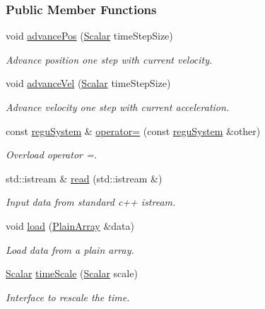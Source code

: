 \subsubsection*{Public Member Functions}
\begin{DoxyCompactItemize}
\item 
void \mbox{\hyperlink{classregu_system_ab1964e22d3d7f6ddaa51c5e7a02534a5}{advance\+Pos}} (\mbox{\hyperlink{classregu_system_aca8ee2c387943164ee3ea68370fc3ac0}{Scalar}} time\+Step\+Size)
\begin{DoxyCompactList}\small\item\em Advance position one step with current velocity. \end{DoxyCompactList}\item 
void \mbox{\hyperlink{classregu_system_ae00564e4aceeec7ce3a8aa6a158aa53e}{advance\+Vel}} (\mbox{\hyperlink{classregu_system_aca8ee2c387943164ee3ea68370fc3ac0}{Scalar}} time\+Step\+Size)
\begin{DoxyCompactList}\small\item\em Advance velocity one step with current acceleration. \end{DoxyCompactList}\item 
const \mbox{\hyperlink{classregu_system}{regu\+System}} \& \mbox{\hyperlink{classregu_system_a894081d40cb90418f791ab52e3c64d5f}{operator=}} (const \mbox{\hyperlink{classregu_system}{regu\+System}} \&other)
\begin{DoxyCompactList}\small\item\em Overload operator =. \end{DoxyCompactList}\item 
std\+::istream \& \mbox{\hyperlink{classregu_system_ae26daf3f6058c1be67fb00366706e2e4}{read}} (std\+::istream \&)
\begin{DoxyCompactList}\small\item\em Input data from standard c++ istream. \end{DoxyCompactList}\item 
void \mbox{\hyperlink{classregu_system_a4da424f127c024fcbef32eff3147b2ff}{load}} (\mbox{\hyperlink{classregu_system_ae2ca73edf865e016a858b694c1d2b49a}{Plain\+Array}} \&data)
\begin{DoxyCompactList}\small\item\em Load data from a plain array. \end{DoxyCompactList}\item 
\mbox{\hyperlink{classregu_system_aca8ee2c387943164ee3ea68370fc3ac0}{Scalar}} \mbox{\hyperlink{classregu_system_ad9aa4594055c550b56cda4242d498d45}{time\+Scale}} (\mbox{\hyperlink{classregu_system_aca8ee2c387943164ee3ea68370fc3ac0}{Scalar}} scale)
\begin{DoxyCompactList}\small\item\em Interface to rescale the time. \end{DoxyCompactList}\end{DoxyCompactItemize}
